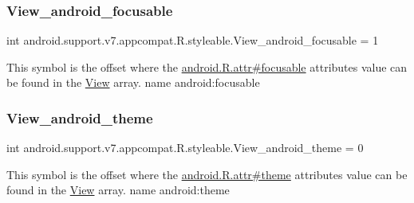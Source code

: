 \subsubsection{\texorpdfstring{View\+\_\+android\+\_\+focusable}{View\_android\_focusable}}
{\footnotesize\ttfamily int android.\+support.\+v7.\+appcompat.\+R.\+styleable.\+View\+\_\+android\+\_\+focusable = 1\hspace{0.3cm}{\ttfamily [static]}}

This symbol is the offset where the \hyperlink{}{android.\+R.\+attr\#focusable} attribute\textquotesingle{}s value can be found in the \hyperlink{classandroid_1_1support_1_1v7_1_1appcompat_1_1R_1_1styleable_a0105bc03f2606ae1fc5f05a515d81b3c}{View} array.  name android\+:focusable \mbox{\label{classandroid_1_1support_1_1v7_1_1appcompat_1_1R_1_1styleable_a399af2d06b82d2a76a27c8a307effed1}} 
\subsubsection{\texorpdfstring{View\+\_\+android\+\_\+theme}{View\_android\_theme}}
{\footnotesize\ttfamily int android.\+support.\+v7.\+appcompat.\+R.\+styleable.\+View\+\_\+android\+\_\+theme = 0\hspace{0.3cm}{\ttfamily [static]}}

This symbol is the offset where the \hyperlink{}{android.\+R.\+attr\#theme} attribute\textquotesingle{}s value can be found in the \hyperlink{classandroid_1_1support_1_1v7_1_1appcompat_1_1R_1_1styleable_a0105bc03f2606ae1fc5f05a515d81b3c}{View} array.  name android\+:theme \mbox{\label{classandroid_1_1support_1_1v7_1_1appcompat_1_1R_1_1styleable_a460b0b2b58042d9f069bb69a7abee61b}} 

